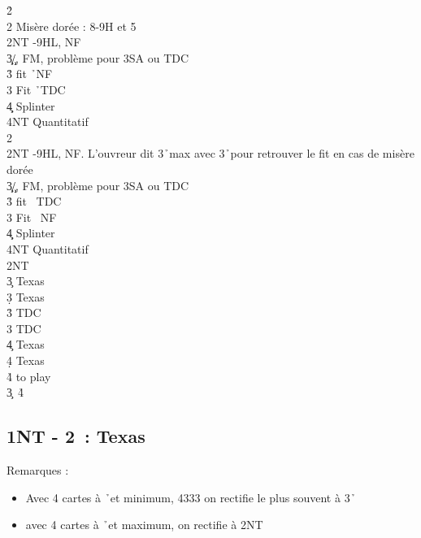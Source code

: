 \documentclass[a4paper]{article}
\begin{document}
\begin{bidtable}
2\h\+\\
2\s \> Misère dorée : 8-9H et 5\s \\
2NT -9HL, NF\\
3\c\d {}\c /\d , FM, problème pour 3SA ou TDC\\
3\h \> fit \h\ NF\\
3\s \> Fit \h\ TDC\\
4\c\d \> Splinter\\
4NT \> Quantitatif\-\\
2\s\+\\
2NT -9HL, NF. L'ouvreur dit 3\h\ max avec 3\h\ pour retrouver le fit en cas de misère dorée\\
3\c\d {}\c /\d , FM, problème pour 3SA ou TDC\\
3\h \> fit \s\ TDC\\
3\s \> Fit \s\ NF\\
4\c\d \> Splinter\\
4NT \> Quantitatif\-\\
2NT\+\\
3\c \> Texas \h \\
3\d \> Texas \s \\
3\h \> TDC\\
3\s \> TDC\\
4\c \> Texas \h \\
4\d \> Texas \s \\
4\h\s \> to play\-\\
3\c {}\s\ 4\h 
\end{bidtable}

\subsection{1NT - 2\pdfd\ : Texas \pdfh}

Remarques :

\begin{itemize}
\item Avec 4 cartes à \h\ et minimum, 4333 on rectifie le plus souvent à 3\h\ 

\item avec 4 cartes à \h\ et maximum, on rectifie à 2NT

\end{itemize}
\end{document}
